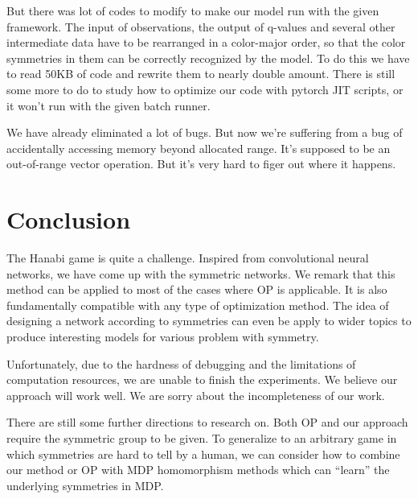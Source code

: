 \documentclass[12pt]{article}
\begin{document}
\begin{spacing}{1.15}
But there was lot of codes to modify to make our model run with the given framework. The input of observations, the output of q-values and several other intermediate data have to be rearranged in a color-major order, so that the color symmetries in them can be correctly recognized by the model. To do this we have to read 50KB of code and rewrite them to nearly double amount. There is still some more to do to study how to optimize our code with pytorch JIT scripts, or it won't run with the given batch runner.

We have already eliminated a lot of bugs. But now we're suffering from a bug of accidentally accessing memory beyond allocated range. It's supposed to be an out-of-range vector operation. But it's very hard to figer out where it happens.

\section{Conclusion}
The Hanabi game is quite a challenge. Inspired from convolutional neural networks, we have come up with the symmetric networks. We remark that this method can be applied to most of the cases where OP is applicable. It is also fundamentally compatible with any type of optimization method. The idea of designing a network according to symmetries can even be apply to wider topics to produce interesting models for various problem with symmetry.

Unfortunately, due to the hardness of debugging and the limitations of computation resources, we are unable to finish the experiments. We believe our approach will work well. We are sorry about the incompleteness of our work.

There are still some further directions to research on. Both OP and our approach require the symmetric group to be given. To generalize to an arbitrary game in which symmetries are hard to tell by a human, we can consider how to combine our method or OP with MDP homomorphism methods which can ``learn'' the underlying symmetries in MDP.

\normalem


\end{spacing}
\end{document}
